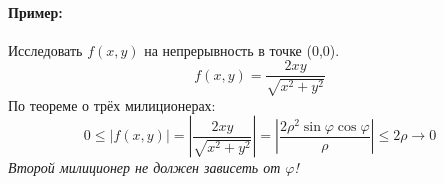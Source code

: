 \documentclass{article}
\newcommand{\ii}{\textit}
\begin{document}
\begin{figure}[h!]
    \centering
    \vspace{-1cm}
\end{figure}
\begin{figure}[h!]
    \centering
    \vspace{-1cm}
\end{figure}
\begin{figure}[h!]
    \centering
    \vspace{-1cm}
\end{figure}


\paragraph*{Пример:} Исследовать $f(x,y)$ на непрерывность в точке (0,0).
$$f(x,y) = \frac{2xy}{\sqrt{x^2+y^2}}$$
По теореме о трёх милиционерах:
$$0 \leq |f(x,y)| = \left| \frac{2xy}{\sqrt{x^2 + y^2}} \right| = \left| \frac{2 \rho^2 \sin\varphi \cos\varphi}{\rho} \right| \leq 2\rho \to 0$$
\ii{Второй милиционер не должен зависеть от $\varphi$!}
\newpage
\end{document}
